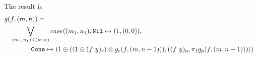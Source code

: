 The result is
\begin{equation*}
  \begin{split}
  &g(f, (m, n)) = \\
  &\quad \bigvee\limits_{(m_1, n_1) \leq (m, n)} case((m_1, n_1), \texttt{Nil} \mapsto (1, (0, 0)), \\
  &\qquad\quad\quad \texttt{Cons} \mapsto (1 \oplus ((1 \oplus (f\ y)_c) \otimes g_c(f, (m, n-1))), ((f\ y)_p, \pi_1 g_p(f, (m, n-1)))))
  \end{split}
\end{equation*}

%

